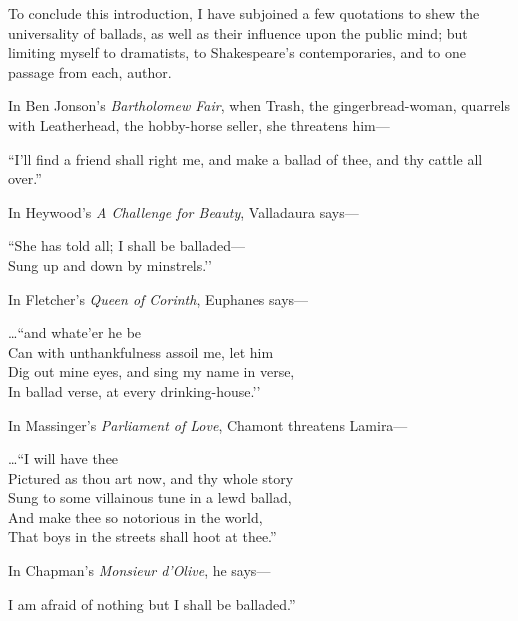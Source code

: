 To conclude this introduction, \pagebreak I have subjoined a few quotations to shew the
universality of ballads, as well as their influence upon the public mind; but limiting
myself to dramatists, to Shakespeare’s contemporaries, and to one passage
from each, author.

\medskip


In Ben Jonson’s \textit{Bartholomew Fair}, when Trash, the gingerbread-woman,
quarrels with Leatherhead, the hobby-horse seller, she threatens him—
\settowidth{\versewidth}{“I'll find a friend shall right me, and make a ballad of thee, and thy cattle all over.”}
\begin{scverse}“I'll find a friend shall right me, and make a ballad of thee, and thy cattle all over.”
\end{scverse}

In Heywood’s \textit{A Challenge for Beauty}, Valladaura says—
\settowidth{\versewidth}{But you must have some scurvy pamphlets and lewd}
\begin{scverse}“She has told all; I shall be balladed—\\
Sung up and down by minstrels.’’
\end{scverse}

In Fletcher’s \textit{Queen of Corinth}, Euphanes says—
\begin{scverse}\dots “and whate’er he be\\
Can with unthankfulness assoil me, let him\\
Dig out mine eyes, and sing my name in verse,\\
In ballad verse, at every drinking-house.’’
\end{scverse}

In Massinger’s \textit{Parliament of Love}, Chamont threatens Lamira—
\begin{scverse}\dots “I will have thee\\
Pictured as thou art now, and thy whole story\\
Sung to some villainous tune in a lewd ballad,\\
And make thee so notorious in the world,\\
That boys in the streets shall hoot at thee.”
\end{scverse}

In Chapman’s \textit{Monsieur d’Olive}, he says—
\begin{scverse}I am afraid of nothing but I shall be balladed.”
\end{scverse}

